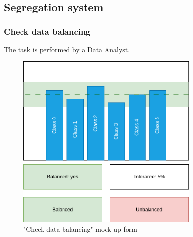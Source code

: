 \subsection{Segregation system}

\subsubsection{Check data balancing}

The task is performed by a Data Analyst.

\begin{figure}[H]
\centering
\includegraphics[width=0.8\textwidth]{figures/check_data_balancing.png}
\caption{"Check data balancing" mock-up form}
\end{figure}

